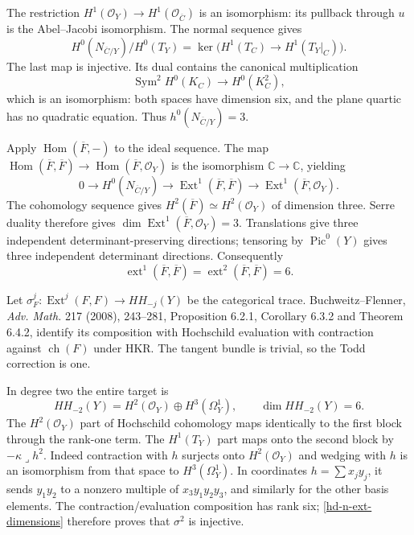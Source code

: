 The restriction $H^1(\mathcal O_Y)\to H^1(\mathcal O_{\overline C})$
is an isomorphism: its pullback through $u$ is the Abel--Jacobi
isomorphism. The normal sequence gives
\[
 H^0(N_{\overline C/Y})/H^0(T_Y)
 =\ker\bigl(H^1(T_C)\longrightarrow H^1(T_Y|_C)\bigr).
\]
The last map is injective. Its dual contains the canonical
multiplication
\[
 \operatorname{Sym}^2H^0(K_C)\longrightarrow H^0(K_C^2),
\]
which is an isomorphism: both spaces have dimension six, and the plane
quartic has no quadratic equation. Thus $h^0(N_{\overline C/Y})=3$.

Apply $\operatorname{Hom}(\overline F,-)$ to the ideal sequence. The
map $\operatorname{Hom}(\overline F,\overline F)\to
\operatorname{Hom}(\overline F,\mathcal O_Y)$ is the isomorphism
$\mathbb C\to\mathbb C$, yielding
\[
 0\longrightarrow H^0(N_{\overline C/Y})
 \longrightarrow\operatorname{Ext}^1(\overline F,\overline F)
 \longrightarrow\operatorname{Ext}^1(\overline F,\mathcal O_Y).
\]
The cohomology sequence gives
$H^2(\overline F)\simeq H^2(\mathcal O_Y)$ of dimension three.
Serre duality therefore gives
$\dim\operatorname{Ext}^1(\overline F,\mathcal O_Y)=3$.
Translations give three independent determinant-preserving directions;
tensoring by $\operatorname{Pic}^0(Y)$ gives three independent
determinant directions. Consequently
\begin{equation}\label{hd-n-ext-dimensions}
 \operatorname{ext}^1(\overline F,\overline F)
 =\operatorname{ext}^2(\overline F,\overline F)=6.
\end{equation}

Let $\sigma^j_F:\operatorname{Ext}^j(F,F)\to HH_{-j}(Y)$ be the
categorical trace. Buchweitz--Flenner, \emph{Adv. Math.} 217 (2008),
243--281, Proposition 6.2.1, Corollary 6.3.2 and Theorem 6.4.2, identify
its composition with Hochschild evaluation with contraction against
$\operatorname{ch}(F)$ under HKR. The tangent bundle is trivial, so the
Todd correction is one.

In degree two the entire target is
\[
 HH_{-2}(Y)=H^2(\mathcal O_Y)\oplus H^3(\Omega_Y^1),
 \qquad\dim HH_{-2}(Y)=6.
\]
The $H^2(\mathcal O_Y)$ part of Hochschild cohomology maps identically
to the first block through the rank-one term. The $H^1(T_Y)$ part maps
onto the second block by $-\kappa\mathbin{\lrcorner}h^2$.
Indeed contraction with $h$ surjects onto $H^2(\mathcal O_Y)$ and
wedging with $h$ is an isomorphism from that space to
$H^3(\Omega_Y^1)$. In coordinates $h=\sum x_jy_j$, it sends
$y_1y_2$ to a nonzero multiple of $x_3y_1y_2y_3$, and similarly for the
other basis elements. The contraction/evaluation composition has rank
six; \eqref{hd-n-ext-dimensions} therefore proves that $\sigma^2$
is injective.

